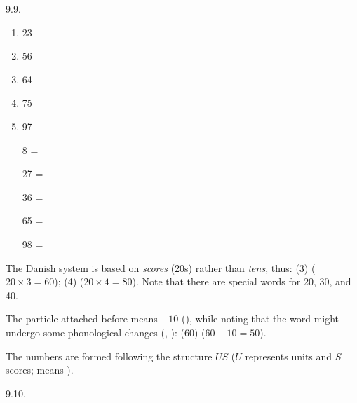 \begin{refsection}
\begin{practiceproblemsolution}{9.9. \langnameDanish}
\begin{solutions}[label=Solution 9.9\alph*]
    \item
    \begin{multicols}{5}
        \begin{enumerate}[label = \alph*.]
            \item 23
            \item 56
            \item 64
            \item 75
            \item 97
        \end{enumerate}
    \end{multicols}
    {\item \setlength\columnsep{-1em}
    \begin{multicols}{3}
    \setlength\columnsep{-2em}
        \begin{enumerate}
            \item[8] = 
            \item[27] = 
            \item[36] = 
            \item[65] = 
            \item[98] = 
        \end{enumerate}
    \end{multicols}}
\end{solutions}


 The Danish system is based on \textit{scores} (20s) rather than \textit{tens}, thus:  (3) \rightarrow {} ($20 \times 3 = 60$);  (4) \rightarrow {} ($20 \times 4 = 80$). Note that there are special words for  20, 30, and 40.

The particle  attached before means $-10$ (), while noting that the word might undergo some phonological changes (, ):  (60) \rightarrow {} ($60 - 10 = 50$).

The numbers are formed following the structure $U$$S$ ($U$ represents units and $S$ scores;  means ).
\end{practiceproblemsolution}


\begin{practiceproblemsolution}{9.10. \langnameEstonian}


\end{practiceproblemsolution}
\end{refsection}
